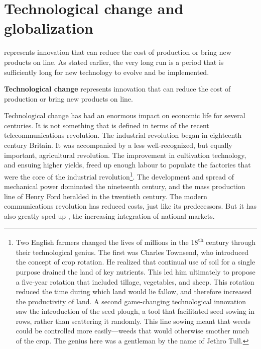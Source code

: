 \section{Technological change and globalization}\label{sec:ch8sec7}

 represents innovation that can reduce the
cost of production or bring new products on line. As stated earlier, the
very long run is a period that is sufficiently long for new technology to
evolve and be implemented.

\begin{DefBox}
	\textbf{Technological change} represents innovation that can reduce the cost of production or bring new products on line.
\end{DefBox}

Technological change has had an enormous impact on economic life for several
centuries. It is not something that is defined in terms of the recent
telecommunications revolution. The industrial revolution began in eighteenth
century Britain. It was accompanied by a less well-recognized, but equally
important, agricultural revolution. The improvement in cultivation
technology, and ensuing higher yields, freed up enough labour to populate
the factories that were the core of the industrial revolution\footnote{
Two English farmers changed the lives of millions in the 18\textsuperscript{th} 
century through their technological genius. The first
was Charles Townsend, who introduced the concept of crop rotation. He
realized that continual use of soil for a single purpose drained the land of
key nutrients. This led him ultimately to propose a five-year rotation that
included tillage, vegetables, and sheep. This rotation reduced the time
during which land would lie fallow, and therefore increased the productivity
of land. A second game-changing technological innovation saw the
introduction of the seed plough, a tool that facilitated seed sowing in
rows, rather than scattering it randomly. This line sowing meant that weeds
could be controlled more easily---weeds that would otherwise smother much of
the crop. The genius here was a gentleman by the name of Jethro Tull.}. The
development and spread of mechanical power dominated the nineteenth century,
and the mass production line of Henry Ford heralded in the twentieth
century. The modern communications revolution has reduced costs, just like
its predecessors. But it has also greatly sped up ,
the increasing integration of national markets.

